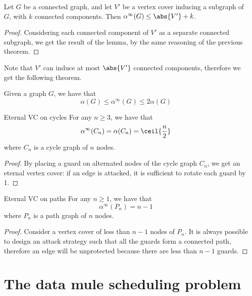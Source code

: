 \documentclass[a4paper, 12pt]{report}
\begin{document}
    \begin{framedlem}{}
        Let $G$ be a connected graph, and let $V'$ be a vertex cover inducing a subgraph of $G$, with $k$ connected components. Then $\alpha^{\infty}(G) \le \abs{V'} + k$.
    \end{framedlem}

    \begin{proof}
        Considering each connected component of $V'$ as a separate connected subgraph, we get the result of the lemma, by the same reasoning of the previous theorem.
    \end{proof}

    Note that $V'$ can induce at most $\abs{V'}$ connected components, therefore we get the following theorem.

    \begin{framedthm}{}
        Given a graph $G$, we have that $$\alpha(G) \le \alpha^{\infty} (G) \le 2 \alpha(G)$$
    \end{framedthm}

    \begin{framedthm}{Eternal VC on cycles}
        For any $n \ge 3$, we have that $$\alpha^{\infty}(C_n) = \alpha(C_n) = \ceil{\frac{n}{2}}$$ where $C_n$ is a cycle graph of $n$ nodes.
    \end{framedthm}

    \begin{proof}
        By placing a guard on alternated nodes of the cycle graph $C_n$, we get an eternal vertex cover: if an edge is attacked, it is sufficient to rotate each guard by 1.
    \end{proof}

    \begin{framedthm}{Eternal VC on paths}
        For any $n \ge 1$, we have that $$\alpha^{\infty}(P_n) = n - 1$$ where $P_n$ is a path graph of $n$ nodes.
    \end{framedthm}
    
    \begin{proof}
        Consider a vertex cover of less than $n - 1$ nodes of $P_n$. It is always possible to design an attack strategy such that all the guards form a connected path, therefore an edge will be unprotected because there are less than $n - 1$ guards.
    \end{proof}

    \chapter{The data mule scheduling problem}
\end{document}
